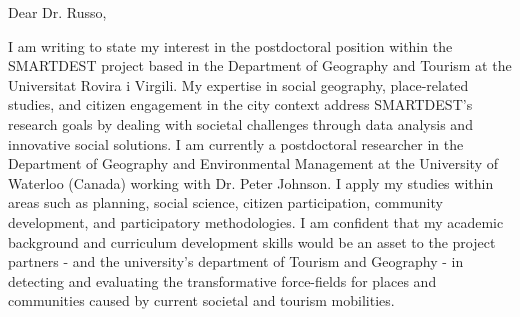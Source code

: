 


Dear Dr. Russo,


I am writing to state my interest in the postdoctoral position within the SMARTDEST project based in the Department of Geography and Tourism at the Universitat Rovira i Virgili. My expertise in social geography, place-related studies, and citizen engagement in the city context address SMARTDEST's research goals by dealing with societal challenges through data analysis and innovative social solutions. I am currently a postdoctoral researcher in the Department of Geography and Environmental Management at the University of Waterloo (Canada) working with Dr. Peter Johnson. I apply my studies within areas such as planning, social science, citizen participation, community development, and participatory methodologies. I am confident that my academic background and curriculum development skills would be an asset to the project partners - and the university's department of Tourism and Geography - in detecting and evaluating the transformative force-fields for places and communities caused by current societal and tourism mobilities.\par


